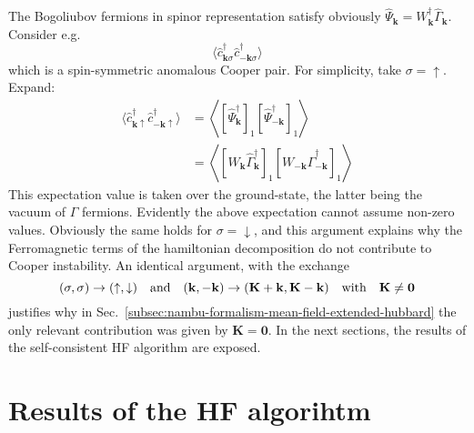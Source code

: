 The Bogoliubov fermions in spinor representation satisfy obviously $\hat \Psi_\mathbf{k} = W_\mathbf{k}^\dagger \hat \Gamma_\mathbf{k}$. Consider e.g.
\[
	\langle
		\hat c_{\mathbf{k}\sigma}^\dagger
		\hat c_{-\mathbf{k}\sigma}^\dagger
	\rangle	
\]
which is a spin-symmetric anomalous Cooper pair. For simplicity, take $\sigma=\uparrow$. Expand:
\[
\begin{aligned}
	\langle
		\hat c_{\mathbf{k}\uparrow}^\dagger
		\hat c_{-\mathbf{k}\uparrow}^\dagger
	\rangle	&= \left\langle 
		[\hat \Psi_\mathbf{k}^\dagger]_1 [\hat \Psi_{-\mathbf{k}}^\dagger]_1 
	\right\rangle \\
	&= \left\langle 
		[W_\mathbf{k} \hat \Gamma_\mathbf{k}^\dagger]_1 [W_{-\mathbf{k}} \hat \Gamma_{-\mathbf{k}}^\dagger]_1 
	\right\rangle
\end{aligned}
\]
This expectation value is taken over the ground-state, the latter being the vacuum of $\Gamma$ fermions. Evidently the above expectation cannot assume non-zero values. Obviously the same holds for $\sigma=\downarrow$, and this argument explains why the Ferromagnetic terms of the hamiltonian decomposition do not contribute to Cooper instability. An identical argument, with the exchange
\[
	(\sigma,\sigma) \to (\uparrow,\downarrow)
	\qq{and}
	(\mathbf{k},-\mathbf{k}) \to (\mathbf{K}+\mathbf{k},\mathbf{K}-\mathbf{k})
	\qq{with}
	\mathbf{K}\neq\mathbf{0}
\]
justifies why in Sec.~\ref{subsec:nambu-formalism-mean-field-extended-hubbard} the only relevant contribution was given by $\mathbf{K}=\mathbf{0}$. In the next sections, the results of the self-consistent HF algorithm are exposed.

\section{Results of the HF algorihtm}\label{sec:mft-analysis-hf-results}

\todo